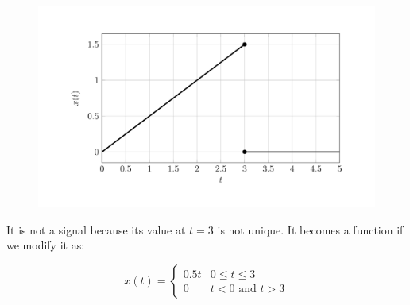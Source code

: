 \documentclass[12pt]{article}
\begin{document}
\begin{figure}
	\begin{center}
		\includegraphics{plot_2-5.svg}
	\end{center}
\end{figure}

It is not a signal because its value at $t=3$ is not unique. It becomes a function if we modify it as:

\[
	x(t)=
	\begin{cases}
		0.5t & 0\le t \le 3                   \\
		0    & t \lt 0 \textrm{ and } t \gt 3
	\end{cases}
\]
\end{document}
